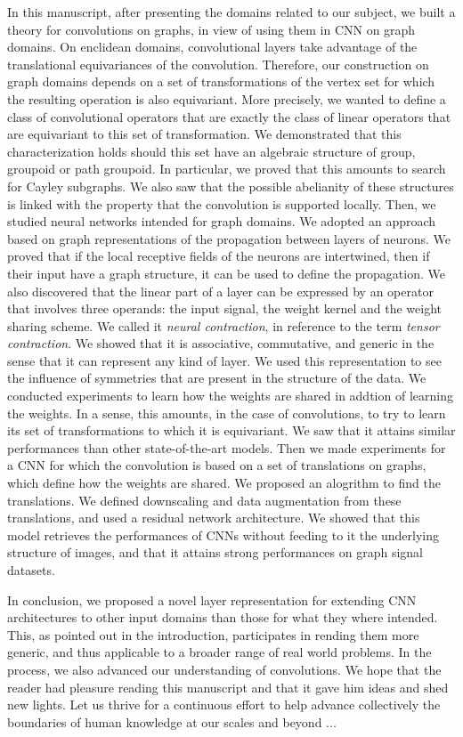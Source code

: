 In this manuscript, after presenting the domains related to our subject, we built a theory for convolutions on graphs, in view of using them in CNN on graph domains. On enclidean domains, convolutional layers take advantage of the translational equivariances of the convolution. Therefore, our construction on graph domains depends on a set of transformations of the vertex set for which the resulting operation is also equivariant. More precisely, we wanted to define a class of convolutional operators that are exactly the class of linear operators that are equivariant to this set of transformation. We demonstrated that this characterization holds should this set have an algebraic structure of group, groupoid or path groupoid. In particular, we proved that this amounts to search for Cayley subgraphs. We also saw that the possible abelianity of these structures is linked with the property that the convolution is supported locally. Then, we studied neural networks intended for graph domains. We adopted an approach based on graph representations of the propagation between layers of neurons. We proved that if the local receptive fields of the neurons are intertwined, then if their input have a graph structure, it can be used to define the propagation. We also discovered that the linear part of a layer can be expressed by an operator that involves three operands: the input signal, the weight kernel and the weight sharing scheme. We called it \emph{neural contraction}, in reference to the term \emph{tensor contraction}. We showed that it is associative, commutative, and generic in the sense that it can represent any kind of layer. We used this representation to see the influence of symmetries that are present in the structure of the data. We conducted experiments to learn how the weights are shared in addtion of learning the weights. In a sense, this amounts, in the case of convolutions, to try to learn its set of transformations to which it is equivariant. We saw that it attains similar performances than other state-of-the-art models. Then we made experiments for a CNN for which the convolution is based on a set of translations on graphs, which define how the weights are shared. We proposed an alogrithm to find the translations. We defined downscaling and data augmentation from these translations, and used a residual network architecture. We showed that this model retrieves the performances of CNNs without feeding to it the underlying structure of images, and that it attains strong performances on graph signal datasets.

In conclusion, we proposed a novel layer representation for extending CNN architectures to other input domains than those for what they where intended. This, as pointed out in the introduction, participates in rending them more generic, and thus applicable to a broader range of real world problems. In the process, we also advanced our understanding of convolutions. We hope that the reader had pleasure reading this manuscript and that it gave him ideas and shed new lights. Let us thrive for a continuous effort to help advance collectively the boundaries of human knowledge at our scales and beyond ...